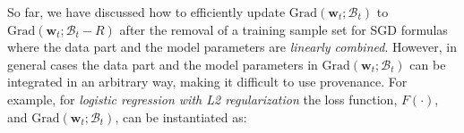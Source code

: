 \documentclass[11pt]{article}
\newcommand{\priu}{PrIU}
\newcommand{\w}{\textbf{w}}
\newcommand{\miniB}{\mathscr{B}}
\begin{document}
So far, we have discussed how to efficiently update $\text{Grad}(\w_t; \miniB_t)$ to $\text{Grad}(\w_t; \miniB_t - R)$ after the removal of a training sample set 
for SGD formulas where the data part and the model parameters are {\em linearly combined}. 
However, in general cases the data part and the model parameters in $\text{Grad}(\w_t; \miniB_t)$ can be integrated in an arbitrary way, making it difficult to use provenance.
For example, for {\em logistic regression with L2 regularization} the loss function, $F(\cdot)$, and $\text{Grad}(\w_t; \miniB_t)$, can be instantiated as:
\end{document}
